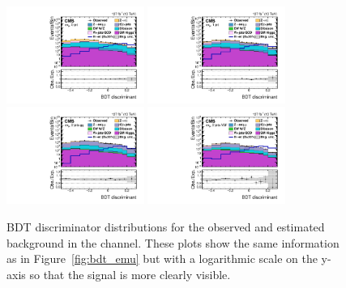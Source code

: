 \begin{figure}[htbp!]
  \centering
  \includegraphics[width=0.4\textwidth]{plots/chapter9/BDT/emu/log_0jet.pdf}
  \includegraphics[width=0.4\textwidth]{plots/chapter9/BDT/emu/log_1jet.pdf} \\
  \includegraphics[width=0.4\textwidth]{plots/chapter9/BDT/emu/log_2jet_gg.pdf}
  \includegraphics[width=0.4\textwidth]{plots/chapter9/BDT/emu/log_2jet_vbf.pdf} \\
  \caption{BDT discriminator distributions for the observed and estimated background in the \emu channel. These plots show the same information as in Figure~\ref{fig:bdt_emu} but with a logarithmic scale on the y-axis so that the signal is more clearly visible.}
  \label{fig:bdt_emu_log}
\end{figure}

